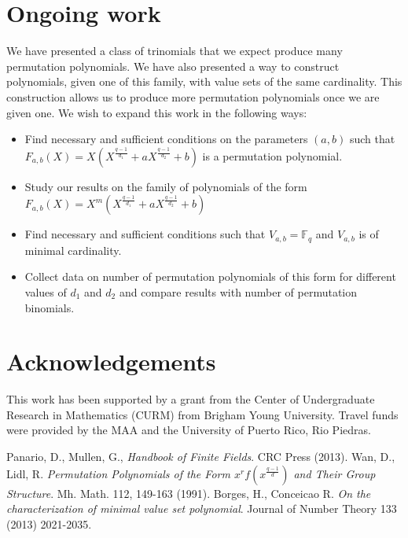 \documentclass{article}
\theoremstyle{definition}
\theoremstyle{remark}
\numberwithin{equation}{section}
\begin{document}
\section{Ongoing work}    
    
    We have presented a class of trinomials that we expect produce many permutation polynomials. We have also presented a way to construct polynomials, given one of this family, with value sets of the same cardinality. This construction allows us to produce more permutation polynomials once we are given one. We wish to expand this work in the following ways:
    \begin{itemize}
    \item Find necessary and sufficient conditions on the parameters $(a,b)$ such that $F_{a,b}(X) = X(X^{\frac{q-1}{d_1}} + aX^{\frac{q-1}{d_2}} +b)$ is a permutation polynomial.
    \item Study our results on the family of polynomials of the form $F_{a,b}(X) = X^m(X^{\frac{q-1}{d_1}} + aX^{\frac{q-1}{d_2}} +b)$
    \item Find necessary and sufficient conditions such that $V_{a,b} = \mathbb{F}_q$ and $V_{a,b}$ is of minimal cardinality.
    \item Collect data on number of permutation polynomials of this form for different values of $d_1$ and $d_2$ and compare results with number of permutation binomials.
  \end{itemize}

\section{Acknowledgements}

  This work has been supported by a grant from the Center of Undergraduate Research in Mathematics (CURM) from Brigham Young University. Travel funds were provided by the MAA and the University of Puerto Rico, Rio Piedras.
 
\begin{thebibliography}{}
       Panario, D., Mullen, G., \textit{Handbook of Finite Fields}. CRC Press (2013).
       Wan, D., Lidl, R. \textit{Permutation Polynomials of the Form $x^{r}f(x^{\frac{q-1}{d}})$ and Their Group Structure}. Mh. Math. 112, 149-163 (1991).
       Borges, H., Conceicao R. \textit{On the characterization of minimal value set polynomial}. Journal of Number Theory 133 (2013) 2021-2035.
    \end{thebibliography}
\end{document}
